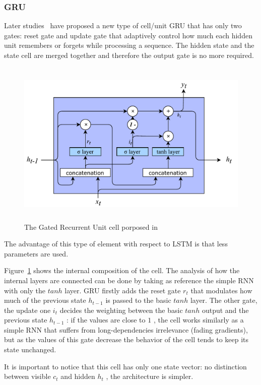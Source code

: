 \subsubsection{GRU}
Later studies~\cite{cho2014learning} have proposed a new type of cell/unit GRU that has only two gates: reset gate and update gate that adaptively control how much each hidden unit remembers or forgets while processing a sequence. The hidden state and the state cell are merged together and therefore the output gate is no more required.

\begin{figure}[!htbp]
    \centering
    \includegraphics[max width=\linewidth,max height=8cm,keepaspectratio]{figures/GRU}
    \caption{The Gated Recurrent Unit cell porposed in~\cite{cho2014learning}}\label{fig:GRU}
\end{figure}

The advantage of this type of element with respect to LSTM is that less parameters are used.

Figure~\ref{fig:GRU} shows the internal composition of the cell. The analysis of how the internal layers are connected can be done by taking as reference the simple RNN with only the  \( tanh \) layer. GRU firstly adds the reset gate  \( r_{t} \) that modulates how much of the previous state  \( h_{t-1} \) is passed to the basic  \( tanh \) layer. The other gate, the update one  \( i_{t} \) decides the weighting between the basic  \( tanh \) output and the previous state  \( h_{t-1} \) : if the values are close to  \( 1 \) , the cell works similarly as a simple RNN that suffers from long-dependencies irrelevance (fading gradients), but as the values of this gate decrease the behavior of the cell tends to keep its state unchanged.

It is important to notice that this cell has only one state vector: no distinction between visible  \( c_{t} \) and hidden  \( h_{t} \) , the architecture is simpler.

